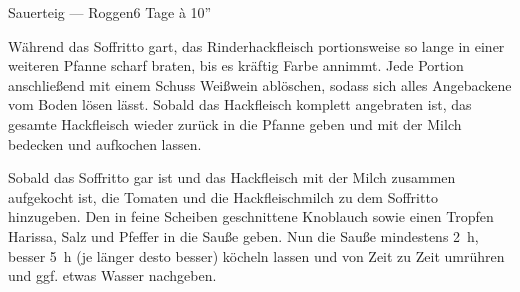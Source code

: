 \begin{MyRecipe}{Sauerteig --- Roggen}{}{6 Tage à 10''}
	
	Während das Soffritto gart, das Rinderhackfleisch portionsweise so lange in einer weiteren Pfanne scharf braten, bis es kräftig Farbe annimmt. Jede Portion  anschließend mit einem Schuss Weißwein ablöschen, sodass sich alles Angebackene vom Boden lösen lässt. Sobald das Hackfleisch komplett angebraten ist, das gesamte Hackfleisch wieder zurück in die Pfanne geben und mit der Milch bedecken und aufkochen lassen.\par\bigskip
	
	
	Sobald das Soffritto gar ist und das Hackfleisch mit der Milch zusammen aufgekocht ist, die Tomaten und die Hackfleischmilch zu dem Soffritto hinzugeben. Den in feine Scheiben geschnittene Knoblauch sowie einen Tropfen Harissa, Salz und Pfeffer in die Sauße geben. Nun die Sauße mindestens \SI{2}{\hour}, besser \SI{5}{\hour} (je länger desto besser) köcheln lassen und von Zeit zu Zeit umrühren und ggf. etwas Wasser nachgeben.
	
	
	
	
\end{MyRecipe}